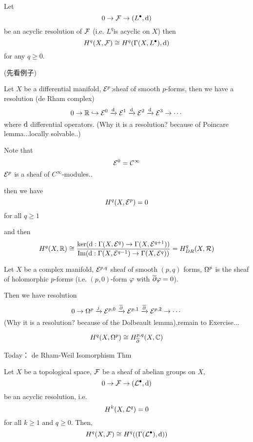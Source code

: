 \begin{thm}
Let
$$0\to\mathcal{F}\to(L^{\bullet},\mathrm{d})$$
be an acyclic resolution of $\mathcal{F}$
(i.e. $L^q$is acyclic on $X$)
then
$$H^q(X,\mathcal{F})\cong H^q(\Gamma(X,L^{\bullet}),\mathrm{d})$$
for any $q\geq 0$.
\end{thm}

(先看例子)

\begin{example}
Let $X$ be a differential manifold,
$\mathcal{E}^p$:sheaf of smooth $p$-forms, then we have a resolution
(de Rham complex)
$$0\to\mathbb{R}\hookrightarrow\mathcal{E}^0\xrightarrow{\mathrm{d}}\mathcal{E}^1
\xrightarrow{\mathrm{d}}\mathcal{E}^2\xrightarrow{\mathrm{d}}\mathcal{E}^3\to\cdots$$
where $\mathrm{d}$ differential operators.
(Why it is a resolution? because of Poincare lemma...locally solvable..)

Note that
$$\mathcal{E}^0=\mathcal{C}^{\infty}$$
$\mathcal{E}^p$ is a sheaf of $C^{\infty}$-modules..

then we have
$$H^q(X,\mathcal{E}^p)=0$$
for all $q\geq1$

and then
$$H^q(X,\mathbb{R})\cong
\frac{\ker(\mathrm{d}:\Gamma(X,\mathcal{E}^q)\to\Gamma(X,\mathcal{E}^{q+1}))}
     {\operatorname{Im}(\mathrm{d}:\Gamma(X,\mathcal{E}^{q-1})\to\Gamma(X,\mathcal{E}^q))}
=H_{DR}^q(X,\mathcal{R})
$$
\end{example}

\begin{example}
Let $X$ be a complex manifold,
$\mathcal{E}^{p,q}$ sheaf of smooth $(p,q)$ forms,
$\Omega^p$ is the sheaf of holomorphic $p$-forms
(i.e. $(p,0)$-form $\varphi$ with $\overline{\partial}\varphi=0$).

Then we have resolution
$$0\to \Omega^p\xrightarrow{j}\mathcal{E}^{p,0}\xrightarrow{\overline{\partial}}\mathcal{E}^{p,1}\xrightarrow{\overline{\partial}}\mathcal{E}^{p,2}\to\cdots$$
(Why it is a resolution?  because of the Dolbeault lemma),remain to Exercise...

$$H^q(X,\Omega^p)\cong H^{p,q}_{\overline{\partial}}(X,\mathbb{C})$$
\end{example}


Today： de Rham-Weil Isomorphism Thm

\begin{thm}
Let $X$ be a topological space, $\mathcal{F}$ be a sheaf of abelian groups on $X$,
$$0\to\mathcal{F}\to(\mathcal{L}^{\bullet},\mathrm{d})$$
be an acyclic resolution, i.e.
$$H^k(X,\mathcal{L}^q)=0$$
for all $k\geq 1$ and $q\geq 0$.
Then,
$$H^q(X,\mathcal{F})\cong H^q((\Gamma(\mathcal{L}^{\bullet}),\mathrm{d}))$$
\end{thm}

